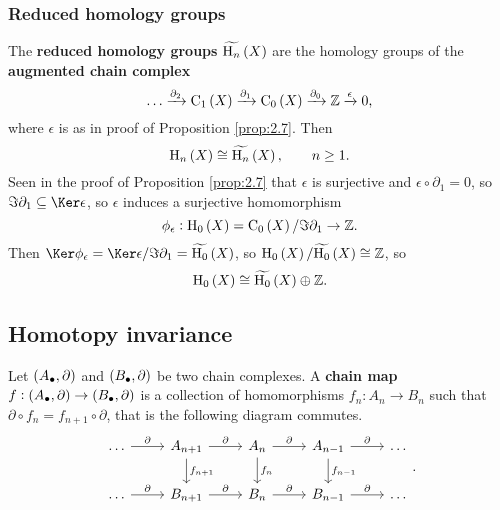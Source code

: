 \subsubsection{Reduced homology groups}

The \textbf{reduced homology groups} $ \widetilde{\H_n}\br{X} $ are the homology groups of the \textbf{augmented chain complex}
$$ \dots \xrightarrow{\partial_2} \C_1\br{X} \xrightarrow{\partial_1} \C_0\br{X} \xrightarrow{\partial_0} \ZZ \xrightarrow{\epsilon} 0, $$
where $ \epsilon $ is as in proof of Proposition \ref{prop:2.7}. Then
$$ \H_n\br{X} \cong \widetilde{\H_n}\br{X}, \qquad n \ge 1. $$
Seen in the proof of Proposition \ref{prop:2.7} that $ \epsilon $ is surjective and $ \epsilon \circ \partial_1 = 0 $, so $ \Im \partial_1 \subseteq \Ker \epsilon $, so $ \epsilon $ induces a surjective homomorphism
$$ \phi_\epsilon : \H_0\br{X} = \C_0\br{X} / \Im \partial_1 \to \ZZ. $$
Then $ \Ker \phi_\epsilon = \Ker \epsilon / \Im \partial_1 = \widetilde{\H_0}\br{X} $, so $ \H_0\br{X} / \widetilde{\H_0}\br{X} \cong \ZZ $, so
$$ \H_0\br{X} \cong \widetilde{\H_0}\br{X} \oplus \ZZ. $$

\pagebreak

\subsection{Homotopy invariance}


Let $ \br{A_\bullet, \partial} $ and $ \br{B_\bullet, \partial} $ be two chain complexes. A \textbf{chain map} $ f : \br{A_\bullet, \partial} \to \br{B_\bullet, \partial} $ is a collection of homomorphisms $ f_n : A_n \to B_n $ such that $ \partial \circ f_n = f_{n + 1} \circ \partial $, that is the following diagram commutes.
$$
\begin{tikzcd}
\dots \arrow{r}{\partial} & A_{n + 1} \arrow{r}{\partial} \arrow{d}{f_{n + 1}} & A_n \arrow{r}{\partial} \arrow{d}{f_n} & A_{n - 1} \arrow{r}{\partial} \arrow{d}{f_{n - 1}} & \dots \\
\dots \arrow{r}{\partial} & B_{n + 1} \arrow{r}{\partial} & B_n \arrow{r}{\partial} & B_{n - 1} \arrow{r}{\partial} & \dots
\end{tikzcd}.
$$

